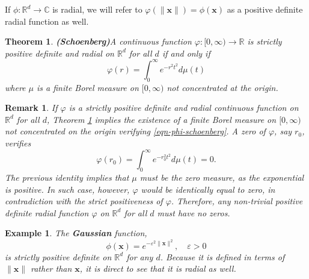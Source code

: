 \documentclass[12pt]{report} %
\newtheorem{theorem}{Theorem}
\newtheorem{example}{Example}
\newtheorem{remark}{Remark}
\newcommand{\tmmathbf}[1]{\ensuremath{\boldsymbol{#1}}}
\newcommand{\tmstrong}[1]{\textbf{#1}}
\begin{document}
If $\phi : \mathbb{R}^d \rightarrow \mathbb{C}$ is radial, we will refer to
$\varphi (\| \tmmathbf{x} \|) = \phi (\tmmathbf{x})$ as a positive definite
radial function as well.

\begin{theorem}
  {\tmstrong{(Schoenberg)}}\label{thm-schoenberg} A continuous function
  $\varphi : [0, \infty) \rightarrow \mathbb{R}$ is strictly positive definite
  and radial on $\mathbb{R}^d$ for all $d$ if and only if
  \begin{equation}
    \varphi (r) = \int_0^{\infty} e^{- r^2 t^2} d \mu (t)
    \label{eqn-phi-schoenberg}
  \end{equation}
  where $\mu$ is a finite Borel measure on $[0, \infty)$ not
  concentrated at the origin.
\end{theorem}

\begin{remark}
  If $\varphi$ is a strictly positive definite and radial continuous function
  on $\mathbb{R}^d$ for all $d$, Theorem \ref{thm-schoenberg} implies the
  existence of a finite Borel measure on $[0, \infty)$ not
  concentrated on the origin verifying \eqref{eqn-phi-schoenberg}. A zero of
  $\varphi$, say $r_0$, verifies
  \[ \varphi (r_0) = \int_0^{\infty} e^{- r_0^2 t^2} d \mu (t) = 0. \]
  The previous identity implies that $\mu$ must be the zero measure, as the
  exponential is positive. In such case, however, $\varphi$ would be
  identically equal to zero, in contradiction with the strict positiveness of
  $\varphi$. Therefore, any non-trivial positive definite radial function
  $\varphi$ on $\mathbb{R}^d$ for all $d$ must have no zeros.
\end{remark}

\begin{example}\label{ex-gaussian-strictly-positive-definite}
  The {\tmstrong{Gaussian}} function,
  \[ \phi (\tmmathbf{x}) = e^{- \varepsilon^2 \| \tmmathbf{x} \|^2}, \quad
    \varepsilon > 0 \]
  is strictly positive definite on $\mathbb{R}^d$ for any $d$. Because it is
  defined in terms of $\| \tmmathbf{x} \|$ rather than $\tmmathbf{x}$, it is
  direct to see that it is radial as well.


\end{example}
\end{document}
